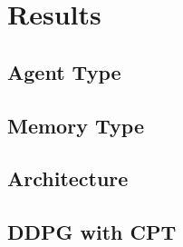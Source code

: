 \section{Results}\label{sec:results}

\subsection{Agent Type}\label{subsec:agent-type}

\subsection{Memory Type}\label{subsec:memory-type}

\subsection{Architecture}\label{subsec:architecture}

\subsection{DDPG with CPT}\label{subsec:ddpg-with-cpt}
